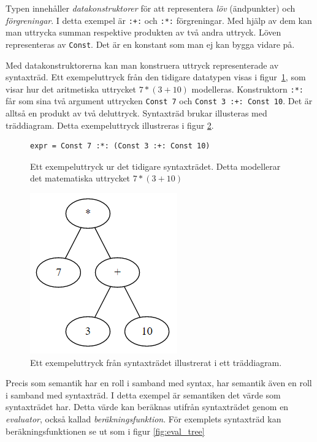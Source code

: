 Typen innehåller \textit{datakonstruktorer} för att representera
\textit{löv} (ändpunkter) och \textit{förgreningar}. I detta exempel är
\texttt{:+:} och \texttt{:*:} förgreningar. Med hjälp av dem kan man uttrycka
summan respektive produkten av två andra uttryck. Löven representeras av
\texttt{Const}. Det är en konstant som man ej kan bygga vidare på.

Med datakonstruktorerna kan man konstruera uttryck representerade av syntaxträd. Ett exempeluttryck
från den tidigare datatypen visas i figur~\ref{fig:syntax_exempel_varde}, som visar hur det aritmetiska uttrycket $7 * (3
+ 10)$ modelleras. Konstruktorn \texttt{:*:} får som sina två argument uttrycken
\texttt{Const 7} och \texttt{Const 3 :+: Const 10}. Det är alltså en produkt av
två deluttryck. Syntaxträd brukar illusteras med träddiagram. Detta
exempeluttryck illustreras i figur \ref{fig:syntax_exempel_bild}.

\begin{figure}[tph]
  \begin{lstlisting}
expr = Const 7 :*: (Const 3 :+: Const 10)
  \end{lstlisting}
  \caption{Ett exempeluttryck ur det tidigare syntaxträdet. Detta modellerar det
           matematiska uttrycket $7 * (3 + 10)$}\label{fig:syntax_exempel_varde}
\end{figure}

\begin{figure}[tph]
  \centering
  \includegraphics[width=0.4\linewidth]{figure/syntax_exempel_bild.png}
  \caption{Ett exempeluttryck från syntaxträdet illustrerat i ett
           träddiagram.}\label{fig:syntax_exempel_bild} 
\end{figure}

Precis som semantik har en roll i samband med syntax, har semantik även en roll
i samband med syntaxträd. I detta exempel är semantiken det värde som
syntaxträdet har. Detta värde kan beräknas utifrån syntaxträdet genom
en \textit{evaluator}, också kallad \textit{beräkningsfunktion}. För exemplets
syntaxträd kan beräkningsfunktionen se ut som i figur \ref{fig:eval_tree}

